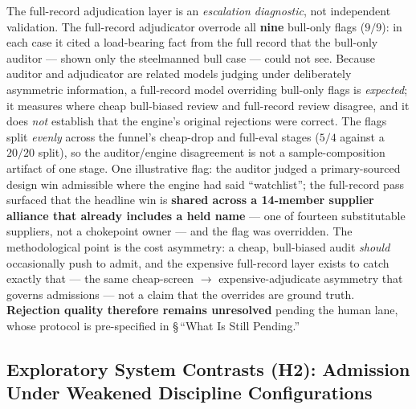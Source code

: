 \documentclass[11pt]{article}
\begin{document}
The full-record adjudication layer is an \emph{escalation diagnostic}, not independent validation.
The full-record adjudicator overrode all \textbf{nine} bull-only flags ($9/9$): in each case it cited
a load-bearing fact from the
full record that the bull-only auditor --- shown only the steelmanned bull case --- could not see.
Because auditor and adjudicator are related models judging under deliberately asymmetric information,
a full-record model overriding bull-only flags is \emph{expected}; it measures where cheap
bull-biased review and full-record review disagree, and it does \emph{not} establish that the
engine's original rejections were correct. The
flags split \emph{evenly} across the funnel's cheap-drop and full-eval stages ($5/4$ against a $20/20$
split), so the auditor/engine disagreement is not a sample-composition artifact of one stage. One
illustrative flag: the auditor judged a primary-sourced design win admissible where the engine had
said ``watchlist''; the full-record pass surfaced that the headline win is \textbf{shared across a
14-member
supplier alliance that already includes a held name} --- one of fourteen substitutable suppliers, not
a chokepoint owner --- and the flag was overridden. The methodological point is the cost asymmetry: a
cheap,
bull-biased audit \emph{should} occasionally push to admit, and the expensive full-record layer exists
to catch
exactly that --- the same cheap-screen $\to$ expensive-adjudicate asymmetry that governs admissions
--- not a claim that the overrides are ground truth. \textbf{Rejection quality therefore remains
unresolved} pending the human lane, whose protocol is pre-specified in \S\,``What Is Still Pending.''

\subsection{Exploratory System Contrasts (H2): Admission Under Weakened Discipline Configurations}
\end{document}
